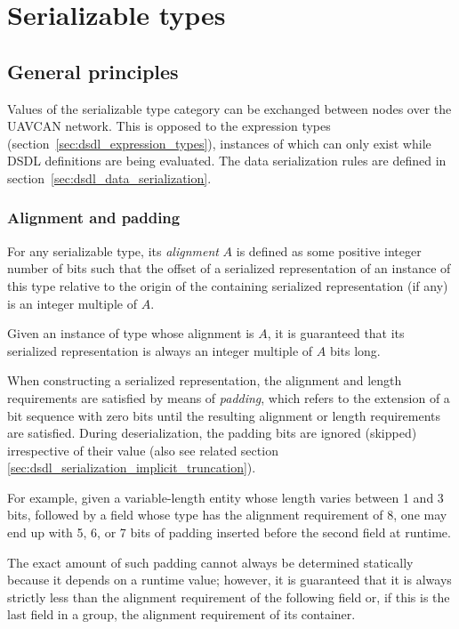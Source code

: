 \section{Serializable types}\label{sec:dsdl_serializable_types}

\subsection{General principles}

Values of the serializable type category can be exchanged between nodes over the UAVCAN network.
This is opposed to the expression types (section~\ref{sec:dsdl_expression_types}),
instances of which can only exist while DSDL definitions are being evaluated.
The data serialization rules are defined in section~\ref{sec:dsdl_data_serialization}.

\subsubsection{Alignment and padding}\label{sec:dsdl_serializable_alignment_padding}

For any serializable type,
its \emph{alignment} $A$ is defined as some positive integer number of bits such that the offset of a
serialized representation of an instance of this type relative to the origin of the
containing serialized representation (if any) is an integer multiple of $A$.

Given an instance of type whose alignment is $A$,
it is guaranteed that its serialized representation is always an integer multiple of $A$ bits long.

When constructing a serialized representation,
the alignment and length requirements are satisfied by means of \emph{padding},
which refers to the extension of a bit sequence with zero bits until
the resulting alignment or length requirements are satisfied.
During deserialization, the padding bits are ignored (skipped) irrespective of their value
(also see related section \ref{sec:dsdl_serialization_implicit_truncation}).

\begin{remark}
    For example, given a variable-length entity whose length varies between 1 and 3 bits,
    followed by a field whose type has the alignment requirement of 8,
    one may end up with 5, 6, or 7 bits of padding inserted before the second field at runtime.

    The exact amount of such padding cannot always be determined statically because it depends on a runtime value;
    however, it is guaranteed that it is always strictly less than the alignment requirement of the following field
    or, if this is the last field in a group, the alignment requirement of its container.
\end{remark}

